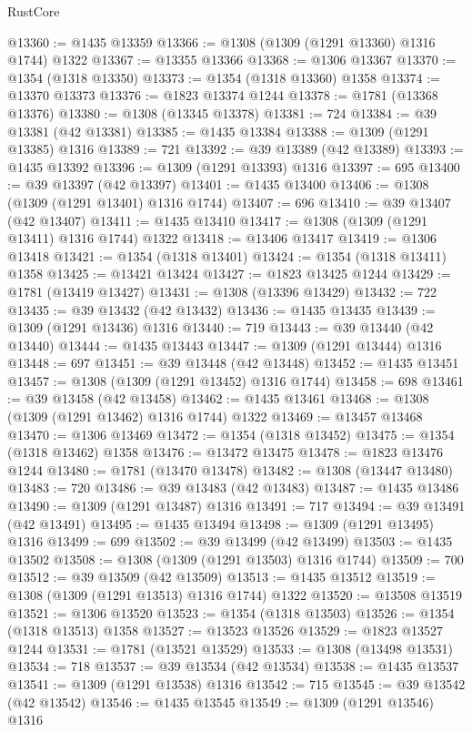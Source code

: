 \begin{lexlean}{RustCore}
\begin{coremodule}
@13360 := @1435 @13359
@13366 := @1308 (@1309 (@1291 @13360) @1316 @1744) @1322
@13367 := @13355 @13366
@13368 := @1306 @13367
@13370 := @1354 (@1318 @13350)
@13373 := @1354 (@1318 @13360) @1358
@13374 := @13370 @13373
@13376 := @1823 @13374 @1244
@13378 := @1781 (@13368 @13376)
@13380 := @1308 (@13345 @13378)
@13381 := 724
@13384 := @39 @13381 (@42 @13381)
@13385 := @1435 @13384
@13388 := @1309 (@1291 @13385) @1316
@13389 := 721
@13392 := @39 @13389 (@42 @13389)
@13393 := @1435 @13392
@13396 := @1309 (@1291 @13393) @1316
@13397 := 695
@13400 := @39 @13397 (@42 @13397)
@13401 := @1435 @13400
@13406 := @1308 (@1309 (@1291 @13401) @1316 @1744)
@13407 := 696
@13410 := @39 @13407 (@42 @13407)
@13411 := @1435 @13410
@13417 := @1308 (@1309 (@1291 @13411) @1316 @1744) @1322
@13418 := @13406 @13417
@13419 := @1306 @13418
@13421 := @1354 (@1318 @13401)
@13424 := @1354 (@1318 @13411) @1358
@13425 := @13421 @13424
@13427 := @1823 @13425 @1244
@13429 := @1781 (@13419 @13427)
@13431 := @1308 (@13396 @13429)
@13432 := 722
@13435 := @39 @13432 (@42 @13432)
@13436 := @1435 @13435
@13439 := @1309 (@1291 @13436) @1316
@13440 := 719
@13443 := @39 @13440 (@42 @13440)
@13444 := @1435 @13443
@13447 := @1309 (@1291 @13444) @1316
@13448 := 697
@13451 := @39 @13448 (@42 @13448)
@13452 := @1435 @13451
@13457 := @1308 (@1309 (@1291 @13452) @1316 @1744)
@13458 := 698
@13461 := @39 @13458 (@42 @13458)
@13462 := @1435 @13461
@13468 := @1308 (@1309 (@1291 @13462) @1316 @1744) @1322
@13469 := @13457 @13468
@13470 := @1306 @13469
@13472 := @1354 (@1318 @13452)
@13475 := @1354 (@1318 @13462) @1358
@13476 := @13472 @13475
@13478 := @1823 @13476 @1244
@13480 := @1781 (@13470 @13478)
@13482 := @1308 (@13447 @13480)
@13483 := 720
@13486 := @39 @13483 (@42 @13483)
@13487 := @1435 @13486
@13490 := @1309 (@1291 @13487) @1316
@13491 := 717
@13494 := @39 @13491 (@42 @13491)
@13495 := @1435 @13494
@13498 := @1309 (@1291 @13495) @1316
@13499 := 699
@13502 := @39 @13499 (@42 @13499)
@13503 := @1435 @13502
@13508 := @1308 (@1309 (@1291 @13503) @1316 @1744)
@13509 := 700
@13512 := @39 @13509 (@42 @13509)
@13513 := @1435 @13512
@13519 := @1308 (@1309 (@1291 @13513) @1316 @1744) @1322
@13520 := @13508 @13519
@13521 := @1306 @13520
@13523 := @1354 (@1318 @13503)
@13526 := @1354 (@1318 @13513) @1358
@13527 := @13523 @13526
@13529 := @1823 @13527 @1244
@13531 := @1781 (@13521 @13529)
@13533 := @1308 (@13498 @13531)
@13534 := 718
@13537 := @39 @13534 (@42 @13534)
@13538 := @1435 @13537
@13541 := @1309 (@1291 @13538) @1316
@13542 := 715
@13545 := @39 @13542 (@42 @13542)
@13546 := @1435 @13545
@13549 := @1309 (@1291 @13546) @1316

\end{coremodule}
\end{lexlean}
